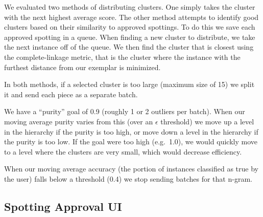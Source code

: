 \documentclass[ms,electronic,twosidetoc,letterpaper,chaptercenter,parttop,lof,lot]{byumsphd}
\begin{document}
We evaluated two methods of distributing clusters.
One simply takes the cluster with the next highest average score.
The other method attempts to identify good clusters based on their similarity to approved spottings. To do this we save each approved spotting in a queue. When finding a new cluster to distribute, we take the next instance off of the queue. We then find the cluster that is closest using the complete-linkage metric, that is the cluster where the instance with the furthest distance from our exemplar is minimized.

In both methods, if a selected cluster is too large (maximum size of 15) we split it and send each piece as a separate batch.

We have a ``purity'' goal of 0.9 (roughly 1 or 2 outliers per batch). When our moving average purity varies from this (over an $\epsilon$ threshold) we move up a level in the hierarchy if the purity is too high, or move down a level in the hierarchy if the purity is too low. If the goal were too high (e.g.~1.0), we would quickly move to a level where the clusters are very small, which would decrease efficiency.

When our moving average accuracy (the portion of instances classified as true by the user) falls below a threshold (0.4) we stop sending batches for that n-gram.

\subsection{Spotting Approval UI}
\end{document}
